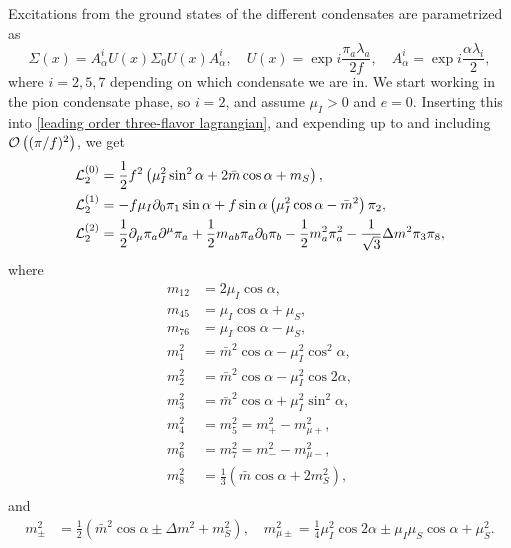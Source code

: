 Excitations from the ground states of the different condensates are parametrized as
%
\begin{equation}
    \Sigma(x) = A^i_\alpha U(x) \Sigma_0 U(x) A^i_\alpha, \quad
    U(x) = \exp{i \frac{\pi_a \lambda_a}{2 f}}, \quad
    A_\alpha^i = \exp{i \frac{\alpha \lambda_i}{2}},
\end{equation}
%
where $i = 2, 5, 7$ depending on which condensate we are in.
We start working in the pion condensate phase, so $i = 2$, and assume $\mu_I > 0$ and $e = 0$.
Inserting this into \autoref{leading order three-flavor lagrangian}, and expending up to and including $\mathcal O\left((\pi/f)^2\right)$, we get
%
\begin{align}
    \label{static three-flavor lagrangian}
    \mathcal{L}_2^{(0)} 
    &=
    \frac{1}{2} f^2
    \left(
        \mu_I^2 \sin^2\alpha
        + 2\bar m \cos\alpha
        + m_S
    \right), \\
    \label{linear three-flavor lagrangian}
    \mathcal{L}_2^{(1)}
    &=
    -f \mu_I \partial_0 \pi_1 \sin\alpha
    + f \sin\alpha
    \left(
        \mu_I^2\cos\alpha - \bar m^2
    \right)\pi_2, \\
    \label{quadratic three-flavor lagrangian}
    \mathcal{L}_2^{(2)} 
    &= 
    \frac{1}{2}\partial_\mu \pi_a \partial^\mu \pi_a
    + \frac{1}{2} m_{ab} \pi_a\partial_0\pi_b
    - \frac{1}{2} m_a^2 \pi_a^2
    - \frac{1}{\sqrt{3}} \Delta m^2 \pi_3 \pi_8,
\end{align}
%
where
%
\begingroup
\allowdisplaybreaks
\begin{align}
    m_{12} & = 2 \mu_I\cos\alpha,\\
    m_{45} & =\mu_I\cos\alpha + \mu_S, \\
    m_{76} & = \mu_I\cos\alpha - \mu_S, \\
    m_1^2 &=  \bar m^2\cos\alpha - \mu_I^2 \cos^2\alpha,\\
    m_2^2 &= \bar m^2\cos\alpha - \mu_I^2 \cos2\alpha, \\
    m_3^2 &= \bar m^2\cos\alpha + \mu_I^2 \sin^2\alpha, \\
    m_4^2 &= m_5^2 = m_+^2 - m_{\mu+}^2, \\
    m_6^2 &= m_7^2 = m_-^2 - m^2_{\mu-}, \\
    m_8^2 &= \frac{1}{3} (\bar m\cos\alpha + 2 m_S^2), \\
\end{align}
\endgroup
%
and
\begin{align}
    m_\pm^2 &= \frac{1}{2} (\bar m^2 \cos\alpha \pm \Delta m^2 + m_S^2),
    \quad
    m^2_{\mu\pm } = \frac{1}{4}\mu_I^2 \cos2\alpha \pm \mu_I\mu_S \cos\alpha + \mu_S^2.
\end{align}
